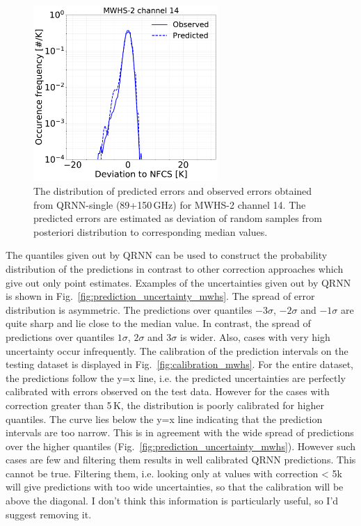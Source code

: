 \documentclass[amt, manuscript]{copernicus}
\newcommand{\todo}[1]{{\color{red} #1}}
\begin{document}
\begin{figure}[t]
	\includegraphics[width=70mm]{Figures/deviation_posterior_mwhs_samples_14.pdf}	
	\caption{The distribution of predicted errors and observed errors  obtained from QRNN-single (89+150\,GHz) for MWHS-2 channel 14. The predicted errors are estimated as deviation of random samples from posteriori distribution to corresponding median values.}
	\label{fig:predicted_errors_mwhs}	
\end{figure}

The quantiles given out by QRNN can be used to construct the probability
distribution of the predictions in contrast to other correction approaches which
give out only point estimates. Examples of the uncertainties given out by QRNN
is shown in Fig.~\ref{fig:prediction_uncertainty_mwhs}. The spread of error
distribution is asymmetric. The predictions over quantiles $-3\sigma$,
$-2\sigma$ and $-1\sigma$ are quite sharp and lie close to the median value. In
contrast, the spread of predictions over quantiles $1\sigma$, $2\sigma$ and
$3\sigma$ is wider. Also, cases with very high uncertainty occur infrequently.
The calibration of the prediction intervals on the testing dataset is displayed
in Fig.~\ref{fig:calibration_mwhs}. For the entire dataset, the predictions
follow the y=x line, i.e. the predicted uncertainties are perfectly calibrated
with errors observed on the test data. However for the cases with correction
greater than 5\,K, the distribution is poorly calibrated for higher quantiles.
The curve lies below the y=x line indicating that the prediction intervals are
too narrow. This is in agreement with the wide spread of predictions over the
higher quantiles (Fig.~\ref{fig:prediction_uncertainty_mwhs}). However such
cases are few and filtering them results in well calibrated QRNN predictions.
\todo{This cannot be true. Filtering them, i.e. looking only at values with
  correction < 5k will give predictions with too wide uncertainties, so that the
  calibration will be above the diagonal. I don't think this information is particularly
useful, so I'd suggest removing it.}
\end{document}
